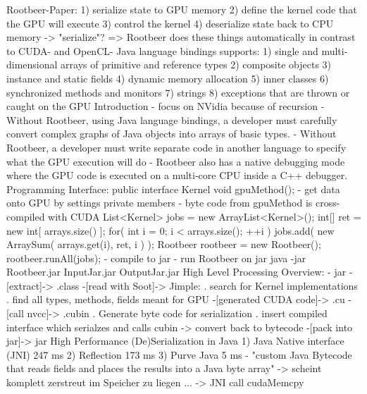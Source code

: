 \begin{frame}
Rootbeer-Paper:
        1) serialize state to GPU memory
        2) define the kernel code that the GPU will execute
        3) control the kernel
        4) deserialize state back to CPU memory
      -> "serialize"?
      => Rootbeer does these things automatically in contrast to CUDA- and OpenCL- Java language bindings
      supports:
        1) single and multi-dimensional arrays of primitive and reference types
        2) composite objects
        3) instance and static fields
        4) dynamic memory allocation
        5) inner classes
        6) synchronized methods and monitors
        7) strings
        8) exceptions that are thrown or caught on the GPU
    Introduction
      - focus on NVidia because of recursion
      - Without Rootbeer, using Java language bindings, a developer must carefully convert complex graphs of Java objects into arrays of basic types.
      - Without Rootbeer, a developer must write separate code in another language to specify what the GPU execution will do
      - Rootbeer also has a native debugging mode where the GPU code is executed on a multi-core CPU inside a C++ debugger.
    Programming Interface:
        public interface Kernel {
            void gpuMethod();
        }
      - get data onto GPU by settings private members
      - byte code from gpuMethod is cross-compiled with CUDA
        List<Kernel> jobs = new ArrayList<Kernel>();
        int[] ret = new int[ arrays.size() ];
        for( int i = 0; i < arrays.size(); ++i )
        {
            jobs.add( new ArraySum( arrays.get(i), ret, i ) );
        }
        Rootbeer rootbeer = new Rootbeer();
        rootbeer.runAll(jobs);
      - compile to jar
      - run Rootbeer on jar
        java -jar Rootbeer.jar InputJar.jar OutputJar.jar
    High Level Processing Overview:
      - jar -[extract]-> .class
            -[read with Soot]-> Jimple:
         . search for Kernel implementations
         . find all types, methods, fields meant for GPU
            -[generated CUDA code]-> .cu
            -[call nvcc]-> .cubin
         . Generate byte code for serialization
         . insert compiled interface which serialzes and calls cubin
           -> convert back to bytecode
        -[pack into jar]-> jar
    High Performance (De)Serialization in Java
        1) Java Native interface (JNI)  247 ms
        2) Reflection                   173 ms
        3) Purve Java                     5 ms
      - "custom Java Bytecode that reads fields and places the results into a Java byte array"
          -> scheint komplett zerstreut im Speicher zu liegen ...
       -> JNI call cudaMemcpy

\end{frame}
